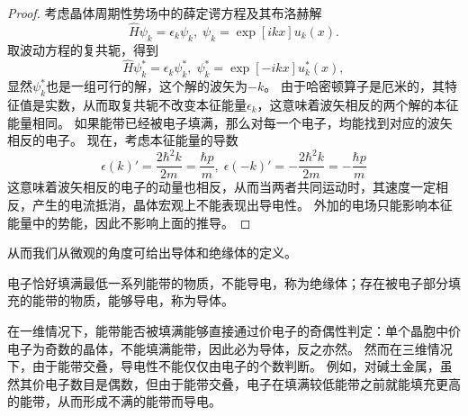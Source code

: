 \begin{proof}
    考虑晶体周期性势场中的薛定谔方程及其布洛赫解
    \begin{equation}
        \hat H \psi_k = \epsilon_k \psi_k, \; \psi_k = \exp[ikx] u_k(x).
    \end{equation}
    取波动方程的复共轭，得到
    \begin{equation}
        \hat H \psi_k^* = \epsilon_k \psi_k^*, \; \psi_k^* = \exp[-ikx] u_k^*(x),
    \end{equation}
    显然$\psi_k^*$也是一组可行的解，这个解的波矢为$-k$。
    由于哈密顿算子是厄米的，其特征值是实数，从而取复共轭不改变本征能量$\epsilon_k$，这意味着波矢相反的两个解的本征能量相同。
    如果能带已经被电子填满，那么对每一个电子，均能找到对应的波矢相反的电子。
    现在，考虑本征能量的导数
    \begin{equation}
        \epsilon(k)' = \frac{2 \hbar^2 k}{2m} = \frac{\hbar p}{m},\; \epsilon(-k)' = - \frac{2 \hbar^2 k}{2m} = - \frac{\hbar p}{m}
    \end{equation}
    这意味着波矢相反的电子的动量也相反，从而当两者共同运动时，其速度一定相反，产生的电流抵消，晶体宏观上不能表现出导电性。
    外加的电场只能影响本征能量中的势能，因此不影响上面的推导。
\end{proof}

从而我们从微观的角度可给出导体和绝缘体的定义。
\begin{definition}
    电子恰好填满最低一系列能带的物质，不能导电，称为绝缘体；存在被电子部分填充的能带的物质，能够导电，称为导体。
\end{definition}

在一维情况下，能带能否被填满能够直接通过价电子的奇偶性判定：单个晶胞中价电子为奇数的晶体，不能填满能带，因此必为导体，反之亦然。
然而在三维情况下，由于能带交叠，导电性不能仅仅由电子的个数判断。
例如，对碱土金属，虽然其价电子数目是偶数，但由于能带交叠，电子在填满较低能带之前就能填充更高的能带，从而形成不满的能带而导电。

